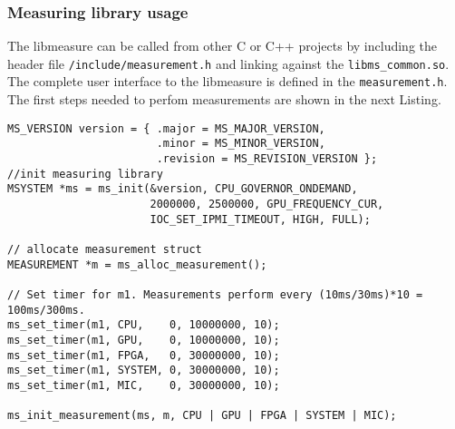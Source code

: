 \subsubsection{Measuring library usage}\label{sec:libmeasureUsage}
The libmeasure can be called from other C or C++ projects by including the header file \texttt{/include/measurement.h} and linking against the \texttt{libms\_common.so}. The complete user interface to the libmeasure is defined in the \texttt{measurement.h}.
The first steps needed to perfom measurements are shown in the next Listing.
\begin{lstlisting}[caption={\added[id=ck]{Listing aktualisiert.}Initialization of our measuring library \texttt{libmeasure}. Each function name has a \texttt{ms\_} prefix.},label=lst:InitMS]
MS_VERSION version = { .major = MS_MAJOR_VERSION,
					   .minor = MS_MINOR_VERSION,
					   .revision = MS_REVISION_VERSION };
//init measuring library
MSYSTEM *ms = ms_init(&version, CPU_GOVERNOR_ONDEMAND,
                      2000000, 2500000, GPU_FREQUENCY_CUR, 
                      IOC_SET_IPMI_TIMEOUT, HIGH, FULL);
	
// allocate measurement struct
MEASUREMENT *m = ms_alloc_measurement();
	
// Set timer for m1. Measurements perform every (10ms/30ms)*10 = 100ms/300ms.
ms_set_timer(m1, CPU,    0, 10000000, 10);
ms_set_timer(m1, GPU,    0, 10000000, 10);
ms_set_timer(m1, FPGA,   0, 30000000, 10);
ms_set_timer(m1, SYSTEM, 0, 30000000, 10);
ms_set_timer(m1, MIC,    0, 30000000, 10);

ms_init_measurement(ms, m, CPU | GPU | FPGA | SYSTEM | MIC);
\end{lstlisting}
